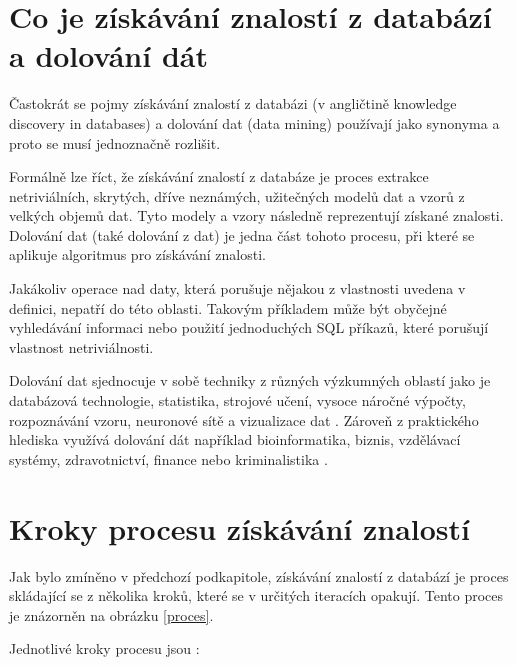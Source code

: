\section{Co je získávání znalostí z databází a dolování dát}
\label{coje}
Častokrát se pojmy získávání znalostí z databázi (v angličtině knowledge discovery in databases) a dolování dat (data mining) používají jako synonyma a proto se musí jednoznačně rozlišit. 

Formálně lze říct, že získávání znalostí z databáze je proces extrakce netriviálních, skrytých, dříve neznámých, užitečných modelů dat a vzorů z velkých objemů dat. Tyto modely a vzory následně reprezentují získané znalosti.
Dolování dat (také dolování z dat) je jedna část tohoto procesu, při které se aplikuje algoritmus pro získávání znalosti. \cite{Dunham} 

Jakákoliv operace nad daty, která porušuje nějakou z vlastnosti uvedena v definici, nepatří do této oblasti. Takovým příkladem může být obyčejné vyhledávání informaci nebo použití jednoduchých SQL příkazů, které porušují vlastnost netriviálnosti. 

Dolování dat sjednocuje v sobě techniky z různých výzkumných oblastí jako je databázová technologie, statistika, strojové učení, vysoce náročné výpočty, rozpoznávání vzoru, neuronové sítě a vizualizace dat \cite{Han}. Zároveň z praktického hlediska využívá dolování dát například bioinformatika, biznis, vzdělávací systémy, zdravotnictví, finance nebo kriminalistika \cite{Neha}. 

\section{Kroky procesu získávání znalostí}
Jak bylo zmíněno v předchozí podkapitole, získávání znalostí z databází je proces skládající se z několika kroků, které se v určitých iteracích opakují. Tento proces je znázorněn na obrázku \ref{proces}.

Jednotlivé kroky procesu jsou \cite{Han}:

